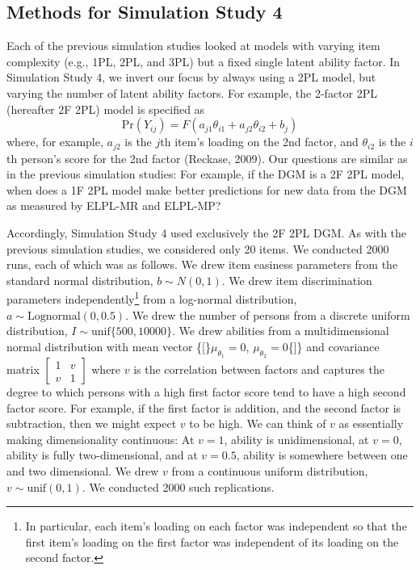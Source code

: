 \documentclass[
  english,
  man,floatsintext]{apa7}
\begin{document}
\hypertarget{methods-for-simulation-study-4}{%
\subsection{Methods for Simulation Study 4}\label{methods-for-simulation-study-4}}

Each of the previous simulation studies looked at models with varying item complexity (e.g., 1PL, 2PL, and 3PL) but a fixed single latent ability factor. In Simulation Study 4, we invert our focus by always using a 2PL model, but varying the number of latent ability factors. For example, the 2-factor 2PL (hereafter 2F 2PL) model is specified as
\begin{equation}
\text{Pr}(Y_{ij}) = F(a_{j1}\theta_{i1} + a_{j2} \theta_{i2} + b_j)
\end{equation}
where, for example, \(a_{j2}\) is the \(j\)th item's loading on the 2nd factor, and \(\theta_{i2}\) is the \(i\)th person's score for the 2nd factor (Reckase, 2009). Our questions are similar as in the previous simulation studies: For example, if the DGM is a 2F 2PL model, when does a 1F 2PL model make better predictions for new data from the DGM as measured by ELPL-MR and ELPL-MP?

Accordingly, Simulation Study 4 used exclusively the 2F 2PL DGM. As with the previous simulation studies, we considered only 20 items. We conducted 2000 runs, each of which was as follows. We drew item easiness parameters from the standard normal distribution, \(b \sim N(0, 1)\). We drew item discrimination parameters independently\footnote{In particular, each item's loading on each factor was independent so that the first item's loading on the first factor was independent of its loading on the second factor.} from a log-normal distribution, \(a \sim \text{Lognormal}(0, 0.5)\). We drew the number of persons from a discrete uniform distribution, \(I \sim \text{unif}\{500, 10000\}\). We drew abilities from a multidimensional normal distribution with mean vector \{{[}\}\(\mu_{\theta_1} = 0\), \(\mu_{\theta_2} = 0\)\{{]}\} and covariance matrix \(\begin{bmatrix} 1 & v \\ v & 1 \end{bmatrix}\) where \(v\) is the correlation between factors and captures the degree to which persons with a high first factor score tend to have a high second factor score. For example, if the first factor is addition, and the second factor is subtraction, then we might expect \(v\) to be high. We can think of \(v\) as essentially making dimensionality continuous: At \(v = 1\), ability is unidimensional, at \(v = 0\), ability is fully two-dimensional, and at \(v = 0.5\), ability is somewhere between one and two dimensional. We drew \(v\) from a continuous uniform distribution, \(v \sim \text{unif}(0, 1)\). We conducted 2000 such replications.
\end{document}
